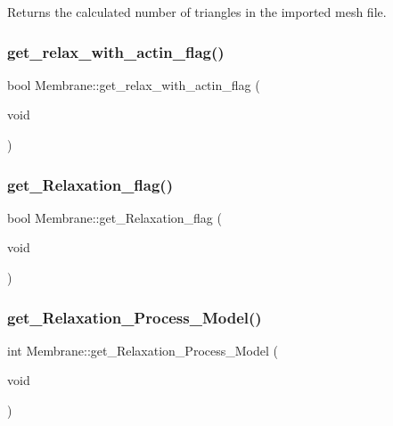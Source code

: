 Returns the calculated number of triangles in the imported mesh file. \mbox{\label{classMembrane_a3030a224f8b882e0bdec2d1fd6861304}} 
\subsubsection{\texorpdfstring{get\_relax\_with\_actin\_flag()}{get\_relax\_with\_actin\_flag()}}
{\footnotesize\ttfamily bool Membrane\+::get\+\_\+relax\+\_\+with\+\_\+actin\+\_\+flag (\begin{DoxyParamCaption}\item[{void}]{ }\end{DoxyParamCaption})\hspace{0.3cm}{\ttfamily [inline]}}

\mbox{\label{classMembrane_a992f7a356099ef58417254d8218fe357}} 
\subsubsection{\texorpdfstring{get\_Relaxation\_flag()}{get\_Relaxation\_flag()}}
{\footnotesize\ttfamily bool Membrane\+::get\+\_\+\+Relaxation\+\_\+flag (\begin{DoxyParamCaption}\item[{void}]{ }\end{DoxyParamCaption})\hspace{0.3cm}{\ttfamily [inline]}}

\mbox{\label{classMembrane_adb66c58c9e5a24936c5ac2ec9bd42290}} 
\subsubsection{\texorpdfstring{get\_Relaxation\_Process\_Model()}{get\_Relaxation\_Process\_Model()}}
{\footnotesize\ttfamily int Membrane\+::get\+\_\+\+Relaxation\+\_\+\+Process\+\_\+\+Model (\begin{DoxyParamCaption}\item[{void}]{ }\end{DoxyParamCaption})\hspace{0.3cm}{\ttfamily [inline]}}

